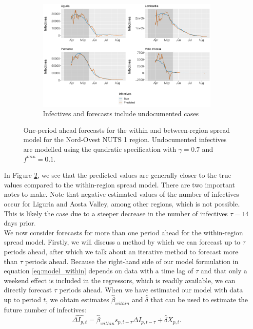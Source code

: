 \documentclass[12pt]{article}
\begin{document}
    \begin{figure}[H]\ContinuedFloat
	    \begin{subfigure}{\textwidth}
	      \centering
	      \includegraphics[width=0.94\linewidth]{output/model_between_lag14_forecast_start20_Nord-Ovest_UndocQuadratic_rolling.pdf}
	      \caption{Infectives and forecasts include undocumented cases}
	      \label{fig:forecast_between_nordovest_undoc}
	    \end{subfigure}
	    \caption{One-period ahead forecasts for the within and between-region spread model for the Nord-Ovest NUTS 1 region. Undocumented infectives are modelled using the quadratic specification with $\gamma = 0.7$ and $f^{min}=0.1$.}
	    \label{fig:forecast_between_nordovest}
    \end{figure}
	
	In Figure \ref{fig:forecast_between_nordovest}, we see that the predicted values are generally closer to the true values compared to the within-region spread model. There are two important notes to make. Note that negative estimated values of the number of infectives occur for Liguria and Aosta Valley, among other regions, which is not possible. This is likely the case due to a steeper decrease in the number of infectives $\tau = 14$ days prior.
	\\
	
	We now consider forecasts for more than one period ahead for the within-region spread model. Firstly, we will discuss a method by which we can forecast up to $\tau$ periods ahead, after which we talk about an iterative method to forecast more than $\tau$ periods ahead. Because the right-hand side of our model formulation in equation \eqref{eq:model_within} depends on data with a time lag of $\tau$ and that only a weekend effect is included in the regressors, which is readily available, we can directly forecast $\tau$ periods ahead. When we have estimated our model with data up to period $t$, we obtain estimates $\widehat{\beta}_{within}$ and $\widehat{\delta}$ that can be used to estimate the future number of infectives:
	    \[\widehat{\Delta I_{p,t}} = \widehat{\beta}_{within} s_{p,t-\tau} \Delta I_{p,t-\tau} + \widehat{\delta} X_{p,t}.\]
	    
\end{document}

